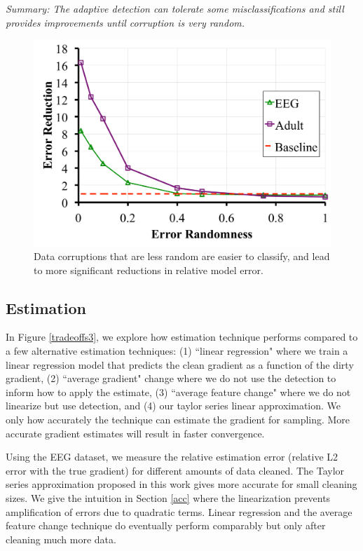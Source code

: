 \vspace{0.25em}

\noindent \emph{Summary: The adaptive detection can tolerate some misclassifications and still provides improvements until corruption is very random. }

\begin{figure}[ht!]
\vspace{-1em}
\centering
 \includegraphics[width=0.5\columnwidth]{exp/exp5a.pdf}
 \caption{Data corruptions that are less random are easier to classify, and lead to more significant reductions in relative model error. \label{tradeoffs2}}
\end{figure}

\subsection{Estimation}\label{est}
In Figure \ref{tradeoffs3}, we explore how estimation technique performs compared to a few alternative estimation techniques: (1) ``linear regression" where we train a linear regression model that predicts the clean gradient as a function of the dirty gradient, (2) ``average gradient" change where we do not use the detection to inform how to apply the estimate, (3) ``average feature change" where we do not linearize but use detection, and (4) our taylor series linear approximation.
We only how accurately the technique can estimate the gradient for sampling.
More accurate gradient estimates will result in faster convergence.

Using the EEG dataset, we measure the relative estimation error (relative L2 error with the true gradient) for different amounts of data cleaned.
The Taylor series approximation proposed in this work gives more accurate for small cleaning sizes.
We give the intuition in Section \ref{acc} where the linearization prevents amplification of errors due to quadratic terms.
Linear regression and the average feature change technique do eventually perform comparably but only after cleaning much more data.

